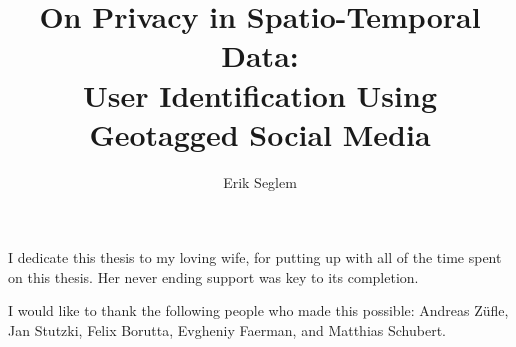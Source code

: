 \documentclass[11 pt]{report}
\begin{document}
\title{On Privacy in Spatio-Temporal Data:\\User Identification Using Geotagged Social Media}
\author{Erik Seglem}
\subject{Geoinformatics and Geospatial Intelligence}











\signaturepage

\titlepage

\copyrightpage


\dedicationpage

\noindent I dedicate this thesis to my loving wife, for putting up with all of the time spent on this thesis. Her never ending support was key to its completion.


\acknowledgementspage

\noindent
I would like to thank the following people who made this possible:
Andreas Z\"ufle, Jan Stutzki, Felix Borutta, Evgheniy Faerman, and Matthias Schubert.
\end{document}

